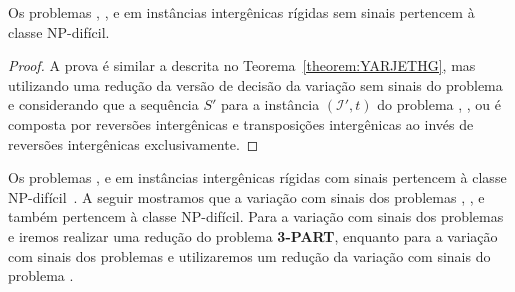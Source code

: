 \begin{theorem}\label{theorem:RDOZOOIB}
Os problemas \SbIRT, \SbIRTI, \SbIRTM{} e \SbIRTMI{} em instâncias intergênicas rígidas sem sinais pertencem à classe NP-difícil.
\end{theorem}
\begin{proof}
A prova é similar a descrita no Teorema~\ref{theorem:YARJETHG}, mas utilizando uma redução da versão de decisão da variação sem sinais do problema \SbRT{} e considerando que a sequência $S'$ para a instância $(\mathcal{I'},t)$ do problema \SbIRT{}, \SbIRTI{}, \SbIRTM{} ou \SbIRTMI{} é composta por reversões intergênicas e transposições intergênicas ao invés de reversões intergênicas exclusivamente.
\end{proof}

Os problemas \SbIR{}, \SbIRT{} e \SbIRTM{} em instâncias intergênicas rígidas com sinais pertencem à classe NP-difícil~\cite{2021a-oliveira-etal,2021b-oliveira-etal}. A seguir mostramos que a variação com sinais dos problemas \SbIRM{}, \SbIRMI{}, \SbIRTI{} e \SbIRTMI{} também pertencem à classe NP-difícil. Para a variação com sinais dos problemas \SbIRM{} e \SbIRMI{} iremos realizar uma redução do problema \textbf{3-PART}, enquanto para a variação com sinais dos problemas \SbIRTI{} e \SbIRTMI{} utilizaremos um redução da variação com sinais do problema \SbRT{}.

